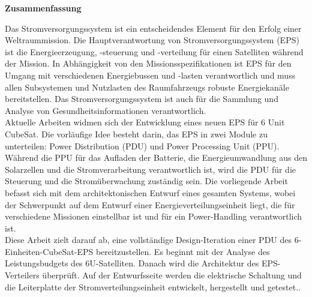 \thispagestyle{empty}
\vspace*{0.2cm}

\begin{center}
    \textbf{Zusammenfassung}
\end{center}

\vspace*{0.2cm}

\noindent 
Das Stromversorgungssystem ist ein entscheidendes Element für den Erfolg einer Weltraummission. Die Hauptverantwortung von Stromversorgungssystem (EPS) ist die Energieerzeugung, -steuerung und -verteilung für einen Satelliten während der Mission. In Abhängigkeit von den Missionsspezifikationen ist EPS für den Umgang mit verschiedenen Energiebussen und -lasten verantwortlich und muss allen Subsystemen und Nutzlasten des Raumfahrzeugs robuste Energiekanäle bereitstellen. Das Stromversorgungssystem ist auch für die Sammlung und Analyse von Gesundheitsinformationen verantwortlich.
\\

Aktuelle Arbeiten widmen sich der Entwicklung eines neuen EPS für 6 Unit CubeSat. Die vorläufige Idee besteht darin, das EPS in zwei Module zu unterteilen: Power Distribution (PDU) und Power Processing Unit (PPU). Während die PPU für das Aufladen der Batterie, die Energieumwandlung aus den Solarzellen und die Stromverarbeitung verantwortlich ist, wird die PDU für die Steuerung und die Stromüberwachung zuständig sein. Die vorliegende Arbeit befasst sich mit dem architektonischen Entwurf eines gesamten Systems, wobei der Schwerpunkt auf dem Entwurf einer Energieverteilungseinheit liegt, die für verschiedene Missionen einstellbar ist und für ein Power-Handling verantwortlich ist.
\\

Diese Arbeit zielt darauf ab, eine vollständige Design-Iteration einer PDU des 6-Einheiten-CubeSat-EPS bereitzustellen. Es beginnt mit der Analyse des Leistungsbudgets des 6U-Satelliten. Danach wird die Architektur des EPS-Verteilers überprüft. Auf der Entwurfsseite werden die elektrische Schaltung und die Leiterplatte der Stromverteilungseinheit entwickelt, hergestellt und getestet..
